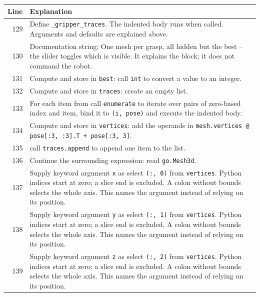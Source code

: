 \documentclass[11pt,a4paper]{book}
\begin{document}
\begin{longtable}{r p{}}

\textbf{Line} & \textbf{Explanation} \\ \hline \endhead

129 & Define \texttt{\_gripper\_traces}. The indented body runs when called. Arguments and defaults are explained above. \\

130 & Documentation string: One mesh per grasp, all hidden but the best -- the slider toggles which is visible. It explains the block; it does not command the robot. \\

131 & Compute and store in \texttt{best}: call \texttt{int} to convert a value to an integer.  \\

132 & Compute and store in \texttt{traces}: create an empty list.  \\

133 & For each item from call \texttt{enumerate} to iterate over pairs of zero-based index and item, bind it to \texttt{(i, pose)} and execute the indented body. \\

134 & Compute and store in \texttt{vertices}: add the operands in \texttt{mesh.vertices @ pose[:3, :3].T + pose[:3, 3]}.  \\

135 & call \texttt{traces.append} to append one item to the list. \\

136 & Continue the surrounding expression: read \texttt{go.Mesh3d}. \\

137 & Supply keyword argument \texttt{x} as select \texttt{(:, 0)} from \texttt{vertices}. Python indices start at zero; a slice end is excluded. A colon without bounds selects the whole axis. This names the argument instead of relying on its position. \\

138 & Supply keyword argument \texttt{y} as select \texttt{(:, 1)} from \texttt{vertices}. Python indices start at zero; a slice end is excluded. A colon without bounds selects the whole axis. This names the argument instead of relying on its position. \\

139 & Supply keyword argument \texttt{z} as select \texttt{(:, 2)} from \texttt{vertices}. Python indices start at zero; a slice end is excluded. A colon without bounds selects the whole axis. This names the argument instead of relying on its position. \\


\end{longtable}
\end{document}
